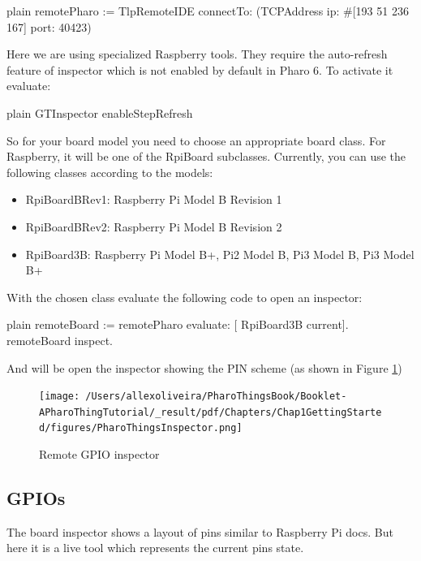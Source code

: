 \documentclass[10pt,twoside,english]{_support/latex/sbabook/sbabook}
\begin{document}
\begin{displaycode}{plain}
remotePharo := TlpRemoteIDE connectTo: (TCPAddress ip: #[193 51 236 167] port: 40423)
\end{displaycode}

Here we are using specialized Raspberry tools. They require the auto-refresh feature of inspector which is not enabled by default in Pharo 6. To activate it evaluate:

\begin{displaycode}{plain}
GTInspector enableStepRefresh
\end{displaycode}

So for your board model you need to choose an appropriate board class. For Raspberry, it will be one of the RpiBoard subclasses. Currently, you can use the following classes according to the models:

\begin{itemize}
\item RpiBoardBRev1: Raspberry Pi Model B Revision 1
\item RpiBoardBRev2: Raspberry Pi Model B Revision 2
\item RpiBoard3B: Raspberry Pi Model B+, Pi2 Model B, Pi3 Model B, Pi3 Model B+
\end{itemize}

With the chosen class evaluate the following code to open an inspector:

\begin{displaycode}{plain}
remoteBoard := remotePharo evaluate: [ RpiBoard3B current].
remoteBoard inspect.
\end{displaycode}

And will be open the inspector showing the PIN scheme (as shown in Figure \ref{PharoThingsinspector})


\begin{figure}

\begin{center}
\texttt{[image: /Users/allexoliveira/PharoThingsBook/Booklet-APharoThingTutorial/\_result/pdf/Chapters/Chap1GettingStarted/figures/PharoThingsInspector.png]}\caption{Remote GPIO inspector\label{PharoThingsinspector}}\end{center}
\end{figure}

\subsection{GPIOs}
The board inspector shows a layout of pins similar to Raspberry Pi docs. But here it is a live tool which represents the current pins state.
\end{document}
